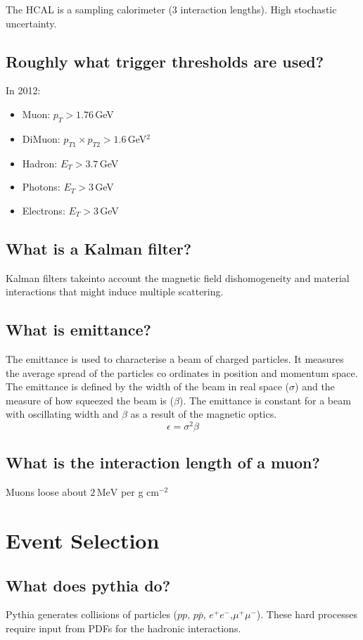 \documentclass[12pt]{article}
\begin{document}
The HCAL is a sampling calorimeter (3 interaction lengths). High stochastic uncertainty.


\subsection{Roughly what trigger thresholds are used?}
In 2012:
\begin{itemize}
\item Muon: $p_{T} > 1.76\,$GeV
\item DiMuon: $p_{T1} \times p_{T2} > 1.6\,$GeV$^2$
\item Hadron: $E_{T} > 3.7\,$GeV
\item Photons: $E_{T} > 3\,$GeV
\item Electrons: $E_{T} > 3\,$GeV
\end{itemize}

\subsection{What is a Kalman filter?}
Kalman filters takeinto account the magnetic field dishomogeneity and material interactions that might induce multiple scattering.


\subsection{What is emittance?}
The emittance is used to characterise a beam of charged particles. It measures the average spread of the particles co ordinates in position and momentum space. 
The emittance is defined by the width of the beam in real space ($\sigma$) and the measure of how squeezed the beam is ($\beta$). The emittance is constant for a beam with oscillating width and $\beta$ as a result of the magnetic optics.
\begin{equation}
\epsilon = \sigma^{2} \beta
\end{equation}
\subsection{What is the interaction length of a muon?}
Muons loose about $2\,\text{MeV}$ per g cm$^{-2}$ 

\section{Event Selection}
\subsection{What does pythia do?}
Pythia generates collisions of particles ($pp$, $p\bar{p}$, $e^{+}e^-$,$\mu^{+}\mu^-$). These hard processes require input from PDFs for the hadronic interactions.
\end{document}
